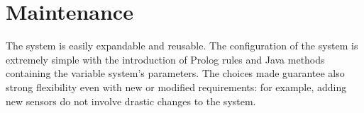 \section{Maintenance}
The system is easily expandable and reusable. The configuration of the system is extremely simple with the introduction of Prolog rules and Java methods containing the variable system's parameters. The choices made guarantee also strong flexibility even with new or modified requirements: for example, adding new sensors do not involve drastic changes to the system.